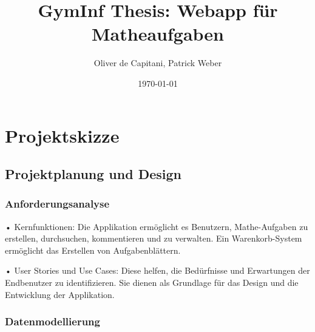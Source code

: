 \documentclass[12pt,a4paper]{article} %
\title{GymInf Thesis: Webapp für Matheaufgaben}
\date{\today}
\author{Oliver de Capitani, Patrick Weber}
\begin{document}
\maketitle %
% 











\newpage %
\tableofcontents %











\newpage


\section{Projektskizze}
\subsection{Projektplanung und Design}
\subsubsection*{Anforderungsanalyse}

•	Kernfunktionen: Die Applikation ermöglicht es Benutzern, Mathe-Aufgaben zu erstellen, durchsuchen, kommentieren und zu verwalten. 
Ein Warenkorb-System ermöglicht das Erstellen von Aufgabenblättern.

•	User Stories und Use Cases: Diese helfen, die Bedürfnisse und Erwartungen der Endbenutzer zu identifizieren. Sie dienen als Grundlage für das Design und die Entwicklung der Applikation.


\subsubsection*{Datenmodellierung}
\end{document}

